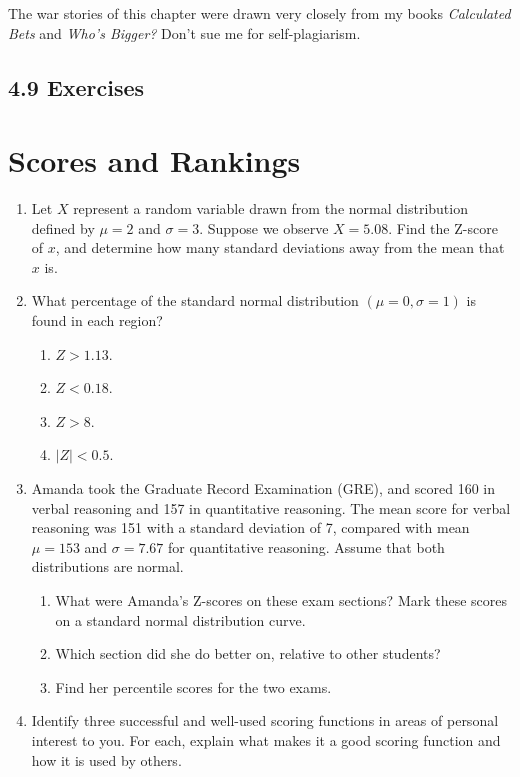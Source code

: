 \documentclass[10pt]{article}
\begin{document}
The war stories of this chapter were drawn very closely from my books \emph{Calculated Bets} and \emph{Who's Bigger?} Don't sue me for self-plagiarism.

\subsection*{4.9 Exercises}
\section*{Scores and Rankings}
\begin{enumerate}
    \item Let $X$ represent a random variable drawn from the normal distribution defined by $\mu=2$ and $\sigma=3$. Suppose we observe $X=5.08$. Find the Z-score of $x$, and determine how many standard deviations away from the mean that $x$ is.
    
    \item What percentage of the standard normal distribution $(\mu=0, \sigma=1)$ is found in each region?
    \begin{enumerate}
        \item $Z > 1.13$.
        \item $Z < 0.18$.
        \item $Z > 8$.
        \item $|Z| < 0.5$.
    \end{enumerate}
    
    \item Amanda took the Graduate Record Examination (GRE), and scored 160 in verbal reasoning and 157 in quantitative reasoning. The mean score for verbal reasoning was 151 with a standard deviation of 7, compared with mean $\mu=153$ and $\sigma=7.67$ for quantitative reasoning. Assume that both distributions are normal.
    \begin{enumerate}
        \item What were Amanda's Z-scores on these exam sections? Mark these scores on a standard normal distribution curve.
        \item Which section did she do better on, relative to other students?
        \item Find her percentile scores for the two exams.
    \end{enumerate}
    
    \item Identify three successful and well-used scoring functions in areas of personal interest to you. For each, explain what makes it a good scoring function and how it is used by others.
    

\end{enumerate}
\end{document}
